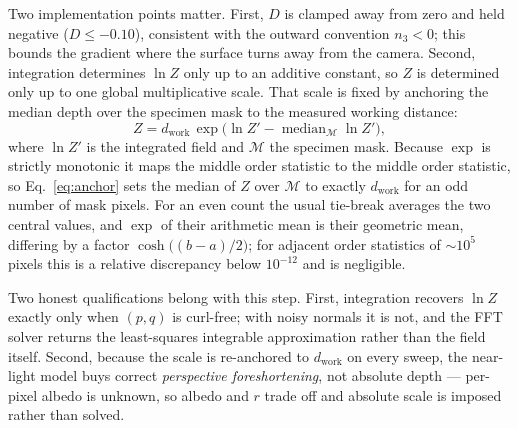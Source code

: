 \documentclass[journal,10pt]{IEEEtran}
\begin{document}
Two implementation points matter. First, $D$ is clamped away from zero and held
negative ($D \le -0.10$), consistent with the outward convention $n_3<0$; this
bounds the gradient where the surface turns away from the camera. Second,
integration determines $\ln Z$ only up to an additive constant, so $Z$ is
determined only up to one global multiplicative scale. That scale is fixed by
anchoring the median depth over the specimen mask to the measured working
distance:
\begin{equation}
Z = d_\mathrm{work}\,
\exp\!\bigl(\ln Z' - \operatorname{median}_{\mathcal{M}} \ln Z'\bigr),
\label{eq:anchor}
\end{equation}
where $\ln Z'$ is the integrated field and $\mathcal{M}$ the specimen mask.
Because $\exp$ is strictly monotonic it maps the middle order statistic to the
middle order statistic, so Eq.~\eqref{eq:anchor} sets the median of $Z$ over
$\mathcal{M}$ to exactly $d_\mathrm{work}$ for an odd number of mask pixels. For
an even count the usual tie-break averages the two central values, and
$\exp$ of their arithmetic mean is their geometric mean, differing by a factor
$\cosh\!\bigl((b-a)/2\bigr)$; for adjacent order statistics of ${\sim}10^5$
pixels this is a relative discrepancy below $10^{-12}$ and is negligible.

Two honest qualifications belong with this step. First, integration recovers
$\ln Z$ exactly only when $(p,q)$ is curl-free; with noisy normals it is not, and
the FFT solver returns the least-squares integrable approximation rather than the
field itself. Second, because the scale is re-anchored to $d_\mathrm{work}$ on
every sweep, the near-light model buys correct \emph{perspective foreshortening},
not absolute depth --- per-pixel albedo is unknown, so albedo and $r$ trade off
and absolute scale is imposed rather than solved.
\end{document}
